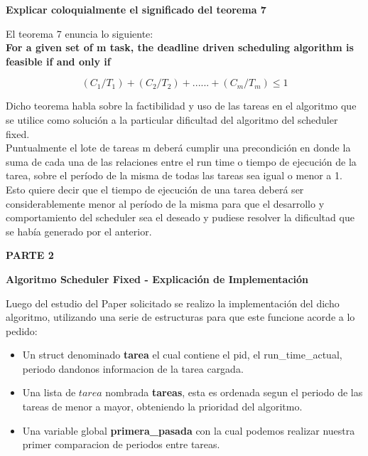 \begin{center}
 \textbf{Explicar coloquialmente el significado del teorema 7}
\end{center}

El teorema 7 enuncia lo siguiente:\\

\textbf{For a given set of m task, the deadline driven scheduling algorithm is feasible if
and only if}
\begin{center}
 \[(C_{1}/T_{1})+(C_{2}/T_{2})+......+(C_{m}/T_{m}) \leq 1\]

\end{center}

Dicho teorema habla sobre la factibilidad y uso de las tareas en el algoritmo que 
se utilice como solución a la particular dificultad del algoritmo del scheduler fixed. \\
Puntualmente el lote de tareas m deberá cumplir una precondición en donde la 
suma de cada una de las relaciones entre el run time o tiempo de ejecución de la tarea, sobre el período de 
la misma de todas las tareas sea igual o menor a 1.\\

Esto quiere decir que el tiempo de ejecución de una tarea deberá ser considerablemente
menor al período de la misma para que el desarrollo y comportamiento del scheduler sea el deseado
y pudiese resolver la dificultad que se había generado por el anterior.\\

\begin{center}
 
\textbf{PARTE 2}\\

\end{center}
\hspace{3pt}
\begin{center}
\textbf{Algoritmo Scheduler Fixed - Explicación de Implementación}\\ 
\end{center}





Luego del estudio del Paper solicitado se realizo la implementación del dicho algoritmo,
utilizando una serie de estructuras para que este funcione acorde a lo pedido:

\begin{itemize}
 \item Un struct denominado  \textbf{tarea} el cual contiene el pid, el run\_time\_actual, periodo dandonos
 informacion de la tarea cargada.
 \item Una lista de $tarea$ nombrada \textbf{tareas}, esta es ordenada segun el periodo de las tareas
 de menor a mayor, obteniendo la prioridad del algoritmo.
  \item Una variable global \textbf{primera\_pasada} con la cual podemos realizar nuestra primer 
 comparacion de periodos entre tareas.
\end{itemize}

